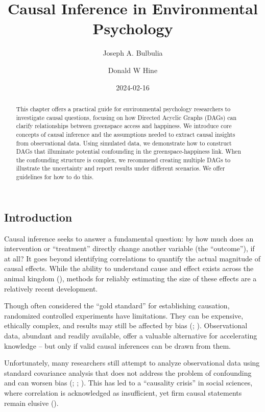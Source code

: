 \documentclass[
  singlecolumn]{article}
\title{Causal Inference in Environmental Psychology}
\author{Joseph A. Bulbulia \and Donald W Hine}
\date{2024-02-16}
\begin{document}
\maketitle
\begin{abstract}
This chapter offers a practical guide for environmental psychology
researchers to investigate causal questions, focusing on how Directed
Acyclic Graphs (DAGs) can clarify relationships between greenspace
access and happiness. We introduce core concepts of causal inference and
the assumptions needed to extract causal insights from observational
data. Using simulated data, we demonstrate how to construct DAGs that
illuminate potential confounding in the greenspace-happiness link. When
the confounding structure is complex, we recommend creating multiple
DAGs to illustrate the uncertainty and report results under different
scenarios. We offer guidelines for how to do this.
\end{abstract}

\subsection{Introduction}\label{introduction}

Causal inference seeks to answer a fundamental question: by how much
does an intervention or ``treatment'' directly change another variable
(the ``outcome''), if at all? It goes beyond identifying correlations to
quantify the actual magnitude of causal effects. While the ability to
understand cause and effect exists across the animal kingdom
(), methods for
reliably estimating the size of these effects are a relatively recent
development.

Though often considered the ``gold standard'' for establishing
causation, randomized controlled experiments have limitations. They can
be expensive, ethically complex, and results may still be affected by
bias (;
).
Observational data, abundant and readily available, offer a valuable
alternative for accelerating knowledge -- but only if valid causal
inferences can be drawn from them.

Unfortunately, many researchers still attempt to analyze observational
data using standard covariance analysis that does not address the
problem of confounding and can worsen bias
(;
;
). This has
led to a ``causality crisis'' in social sciences, where correlation is
acknowledged as insufficient, yet firm causal statements remain elusive
().
\end{document}
